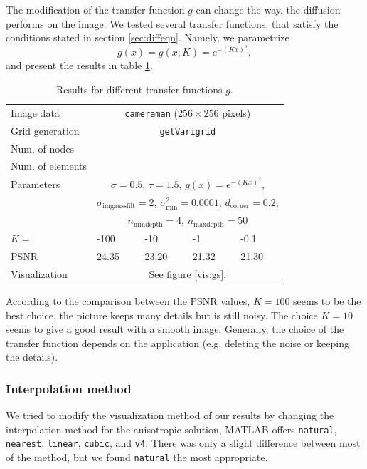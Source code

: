 \documentclass{report}
\begin{document}
The modification of the transfer function $g$ can change the way, the diffusion performs on the image. We tested several transfer functions, that satisfy the conditions stated in section \ref{sec:diffeqn}. Namely, we parametrize
\begin{equation}
	g(x) = g(x; K)= e^{-(Kx)^2},
\end{equation}
and present the results in table \ref{res:gs}.

\begin{table}[h]
	\centering
	\begin{tabular}{|lllll}
		Image data & \multicolumn{4}{c}{\texttt{cameraman} ($256 \times 256$ pixels)} \\
		Grid generation & \multicolumn{4}{c}{\texttt{getVarigrid}} \\
		Num. of nodes & \multicolumn{4}{c}{} \\
		Num. of elements & \multicolumn{4}{c}{} \\
		Parameters & \multicolumn{4}{c}{$\sigma=0.5$, $\tau=1.5$, $g(x) = e^{-(Kx)^2}$,} \\
		& \multicolumn{4}{c}{$\sigma_\text{imgaussfilt}=2$, $\sigma^2_\text{min}=0.0001$, $d_\text{corner}=0.2$,} \\
		& \multicolumn{4}{c}{$n_\text{mindepth}=4$, $n_\text{maxdepth}=50$} \\
		$K =$ & -100 & -10 & -1 & -0.1 \\
		PSNR & 24.35 & 23.20 & 21.32 & 21.30 \\
		Visualization &  \multicolumn{4}{c}{See figure \ref{vis:gs}.} \\
	\end{tabular}
	\caption{Results for different transfer functions $g$.}
	\label{res:gs}
\end{table}

According to the comparison between the PSNR values, $K=100$ seems to be the best choice, the picture keeps many details but is still noisy. The choice $K=10$ seems to give a good result with a smooth image. Generally, the choice of the transfer function depends on the application (e.g. deleting the noise or keeping the details).

\subsubsection{Interpolation method}

We tried to modify the visualization method of our results by changing the interpolation method for the anisotropic solution, MATLAB offers \texttt{natural}, \texttt{nearest}, \texttt{linear}, \texttt{cubic}, and \texttt{v4}. There was only a slight difference between most of the method, but we found \texttt{natural} the most appropriate.
\end{document}
